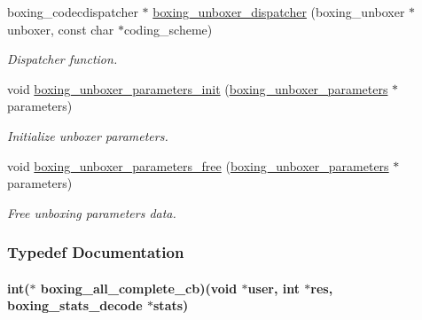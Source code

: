 \begin{DoxyCompactItemize}
boxing\_\-codecdispatcher $\ast$ \hyperlink{group__unboxer_gacef2db1849f3d7e1e718cf8bdae2a302}{boxing\_\-unboxer\_\-dispatcher} (boxing\_\-unboxer $\ast$unboxer, const char $\ast$coding\_\-scheme)
\begin{DoxyCompactList}\small\item\em Dispatcher function. \item\end{DoxyCompactList}\item 
void \hyperlink{group__unboxer_ga98551069c5b6d815ea59fab7a4ac4040}{boxing\_\-unboxer\_\-parameters\_\-init} (\hyperlink{structboxing__unboxer__parameters__s}{boxing\_\-unboxer\_\-parameters} $\ast$parameters)
\begin{DoxyCompactList}\small\item\em Initialize unboxer parameters. \item\end{DoxyCompactList}\item 
void \hyperlink{group__unboxer_gaa4015256c5bc7f8e1f359a583117c792}{boxing\_\-unboxer\_\-parameters\_\-free} (\hyperlink{structboxing__unboxer__parameters__s}{boxing\_\-unboxer\_\-parameters} $\ast$parameters)
\begin{DoxyCompactList}\small\item\em Free unboxing parameters data. \item\end{DoxyCompactList}\end{DoxyCompactItemize}


\subsubsection{Typedef Documentation}
\hypertarget{group__unboxer_ga26d1d88b45ca8c86a13af64e4dd4830b}{
\paragraph[{boxing\_\-all\_\-complete\_\-cb}]{\setlength{\rightskip}{0pt plus 5cm}int($\ast$ {\bf boxing\_\-all\_\-complete\_\-cb})(void $\ast$user, int $\ast$res, boxing\_\-stats\_\-decode $\ast$stats)}\hfill}
\label{group__unboxer_ga26d1d88b45ca8c86a13af64e4dd4830b}

